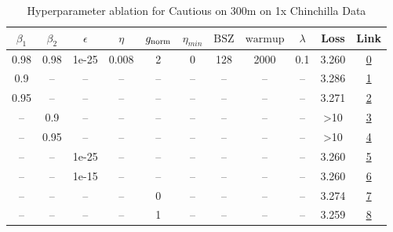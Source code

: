 \begin{table}[H]
\centering
\caption{Hyperparameter ablation for Cautious on 300m on 1x Chinchilla Data}
\label{tab:ablation_cautious_300m_on_1x_chinchilla_data}
\begin{tabular}{ccccccccccc}
\toprule
$\beta_1$ & $\beta_2$ & $\epsilon$ & $\eta$ & $g_{\mathrm{norm}}$ & $\eta_{min}$ & $\mathrm{BSZ}$ & $\mathrm{warmup}$ & $\lambda$ & Loss & Link \\
\midrule
0.98 & 0.98 & 1e-25 & 0.008 & 2 & 0 & 128 & 2000 & 0.1 & 3.260 & \href{https://wandb.ai/marin-community/optimizer-scaling/runs/sweep-300m-6B-cautiousc8346clr0.008-wd0.1-minlr0-warmup2000-b10.-852297}{0} \\
\midrule
0.9 & -- & -- & -- & -- & -- & -- & -- & -- & 3.286 & \href{https://wandb.ai/marin-community/optimizer-scaling/runs/sweep-300m-6B-cautiousfed852lr0.008-wd0.1-minlr0-warmup2000-b10.-4b06ef}{1} \\
0.95 & -- & -- & -- & -- & -- & -- & -- & -- & 3.271 & \href{https://wandb.ai/marin-community/optimizer-scaling/runs/sweep-300m-6B-cautious7244dblr0.008-wd0.1-minlr0-warmup2000-b10.-5fd975}{2} \\
-- & 0.9 & -- & -- & -- & -- & -- & -- & -- & >10 & \href{https://wandb.ai/marin-community/optimizer-scaling/runs/sweep-300m-6B-cautiousd8e2a3lr0.008-wd0.1-minlr0-warmup2000-b10.-3812f2}{3} \\
-- & 0.95 & -- & -- & -- & -- & -- & -- & -- & >10 & \href{https://wandb.ai/marin-community/optimizer-scaling/runs/sweep-300m-6B-cautious69dafalr0.008-wd0.1-minlr0-warmup2000-b10.-5e0115}{4} \\
-- & -- & 1e-25 & -- & -- & -- & -- & -- & -- & 3.260 & \href{https://wandb.ai/marin-community/optimizer-scaling/runs/sweep-300m-6B-cautiousc8346clr0.008-wd0.1-minlr0-warmup2000-b10.-852297}{5} \\
-- & -- & 1e-15 & -- & -- & -- & -- & -- & -- & 3.260 & \href{https://wandb.ai/marin-community/optimizer-scaling/runs/sweep-300m-6B-cautious56bf47lr0.008-wd0.1-minlr0-warmup2000-b10.-19a98d}{6} \\
-- & -- & -- & -- & 0 & -- & -- & -- & -- & 3.274 & \href{https://wandb.ai/marin-community/optimizer-scaling/runs/sweep-300m-6B-cautiousd6637dlr0.008-wd0.1-minlr0-warmup2000-b10.-2815cd}{7} \\
-- & -- & -- & -- & 1 & -- & -- & -- & -- & 3.259 & \href{https://wandb.ai/marin-community/optimizer-scaling/runs/sweep-300m-6B-cautiousbb2ad9lr0.008-wd0.1-minlr0-warmup2000-b10.-fd7e98}{8} \\

\end{tabular}
\end{table}
